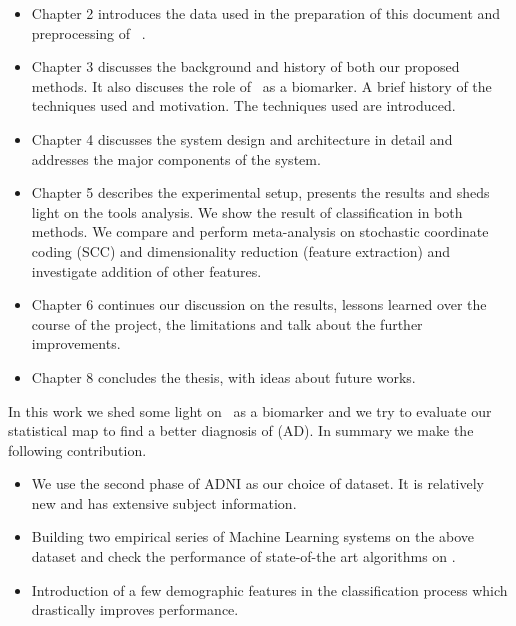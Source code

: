 \begin{itemize}
	\item Chapter 2 introduces the data used in the preparation of this document and preprocessing of \FDGPET~.
	\item Chapter 3 discusses the background and history of both our proposed methods. It also discuses the role of \FDGPET~as a biomarker. A brief history of the techniques used and motivation. The techniques used are introduced. 
	\item Chapter 4 discusses the system design and architecture in detail and addresses the major components of the system.	
	\item Chapter 5 describes the experimental setup, presents the results and sheds light on the tools analysis. We show the result of classification in both methods. We compare and perform meta-analysis on stochastic coordinate coding (SCC) and dimensionality reduction (feature extraction) and investigate addition of other features. 
	\item Chapter 6 continues our discussion on the results, lessons learned over the course of the project, the limitations and talk about the further improvements.
	\item Chapter 8 concludes the thesis, with ideas about future works.
	
\end{itemize}
	
In this work we shed some light on \FDGPET~as a biomarker and we try to evaluate our statistical map to find a better diagnosis of (AD). In summary we make the following contribution.

\begin{itemize}
	\item We use the second phase of ADNI as our choice of dataset. It is relatively new and has extensive subject information.
	\item Building two empirical series of Machine Learning systems on the above dataset and check the performance of state-of-the art algorithms on \FDGPET.
	\item Introduction of a few demographic features in the classification process which drastically improves performance.     
\end{itemize}    	
	
